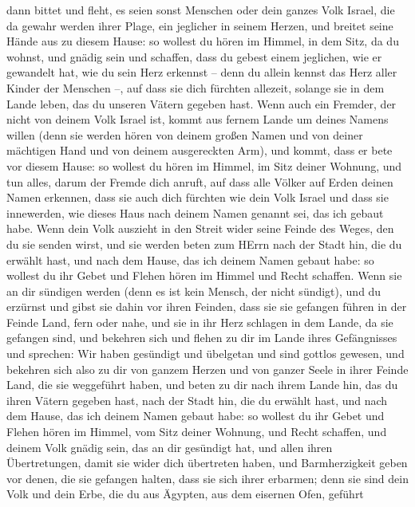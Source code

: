dann bittet und fleht, es seien sonst Menschen oder dein ganzes Volk
Israel, die da gewahr werden ihrer Plage, ein jeglicher in seinem
Herzen, und breitet seine Hände aus zu diesem Hause:  so
wollest du hören im Himmel, in dem Sitz, da du wohnst, und gnädig sein
und schaffen, dass du gebest einem jeglichen, wie er gewandelt hat, wie
du sein Herz erkennst -- denn du allein kennst das Herz aller Kinder der
Menschen --,  auf dass sie dich fürchten allezeit, solange
sie in dem Lande leben, das du unseren Vätern gegeben hast.
 Wenn auch ein Fremder, der nicht von deinem Volk Israel
ist, kommt aus fernem Lande um deines Namens willen  (denn
sie werden hören von deinem großen Namen und von deiner mächtigen Hand
und von deinem ausgereckten Arm), und kommt, dass er bete vor diesem
Hause:  so wollest du hören im Himmel, im Sitz deiner
Wohnung, und tun alles, darum der Fremde dich anruft, auf dass alle
Völker auf Erden deinen Namen erkennen, dass sie auch dich fürchten wie
dein Volk Israel und dass sie innewerden, wie dieses Haus nach deinem
Namen genannt sei, das ich gebaut habe.  Wenn dein Volk
auszieht in den Streit wider seine Feinde des Weges, den du sie senden
wirst, und sie werden beten zum HErrn nach der Stadt hin, die du erwählt
hast, und nach dem Hause, das ich deinem Namen gebaut habe:
 so wollest du ihr Gebet und Flehen hören im Himmel und
Recht schaffen.  Wenn sie an dir sündigen werden (denn es
ist kein Mensch, der nicht sündigt), und du erzürnst und gibst sie dahin
vor ihren Feinden, dass sie sie gefangen führen in der Feinde Land, fern
oder nahe,  und sie in ihr Herz schlagen in dem Lande, da
sie gefangen sind, und bekehren sich und flehen zu dir im Lande ihres
Gefängnisses und sprechen: Wir haben gesündigt und übelgetan und sind
gottlos gewesen,  und bekehren sich also zu dir von ganzem
Herzen und von ganzer Seele in ihrer Feinde Land, die sie weggeführt
haben, und beten zu dir nach ihrem Lande hin, das du ihren Vätern
gegeben hast, nach der Stadt hin, die du erwählt hast, und nach dem
Hause, das ich deinem Namen gebaut habe:  so wollest du ihr
Gebet und Flehen hören im Himmel, vom Sitz deiner Wohnung, und Recht
schaffen,  und deinem Volk gnädig sein, das an dir
gesündigt hat, und allen ihren Übertretungen, damit sie wider dich
übertreten haben, und Barmherzigkeit geben vor denen, die sie gefangen
halten, dass sie sich ihrer erbarmen;  denn sie sind dein
Volk und dein Erbe, die du aus Ägypten, aus dem eisernen Ofen, geführt
